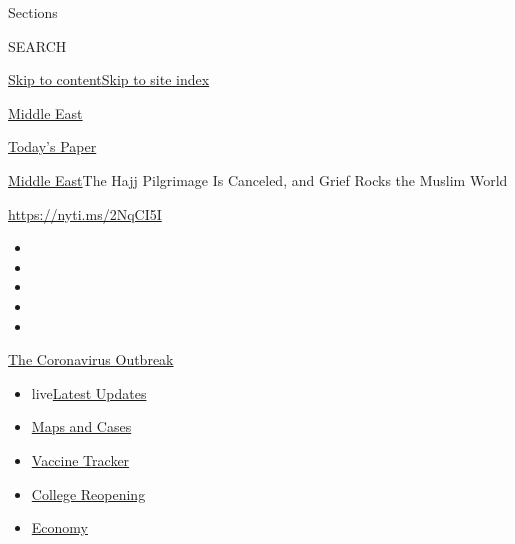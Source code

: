 Sections

SEARCH

\protect\hyperlink{site-content}{Skip to
content}\protect\hyperlink{site-index}{Skip to site index}

\href{https://www.nytimes3xbfgragh.onion/section/world/middleeast}{Middle
East}

\href{https://myaccount.nytimes3xbfgragh.onion/auth/login?response_type=cookie\&client_id=vi}{}

\href{https://www.nytimes3xbfgragh.onion/section/todayspaper}{Today's
Paper}

\href{/section/world/middleeast}{Middle East}\textbar{}The Hajj
Pilgrimage Is Canceled, and Grief Rocks the Muslim World

\url{https://nyti.ms/2NqCI5I}

\begin{itemize}
\item
\item
\item
\item
\item
\end{itemize}

\href{https://www.nytimes3xbfgragh.onion/news-event/coronavirus?action=click\&pgtype=Article\&state=default\&region=TOP_BANNER\&context=storylines_menu}{The
Coronavirus Outbreak}

\begin{itemize}
\tightlist
\item
  live\href{https://www.nytimes3xbfgragh.onion/2020/08/04/world/coronavirus-cases.html?action=click\&pgtype=Article\&state=default\&region=TOP_BANNER\&context=storylines_menu}{Latest
  Updates}
\item
  \href{https://www.nytimes3xbfgragh.onion/interactive/2020/us/coronavirus-us-cases.html?action=click\&pgtype=Article\&state=default\&region=TOP_BANNER\&context=storylines_menu}{Maps
  and Cases}
\item
  \href{https://www.nytimes3xbfgragh.onion/interactive/2020/science/coronavirus-vaccine-tracker.html?action=click\&pgtype=Article\&state=default\&region=TOP_BANNER\&context=storylines_menu}{Vaccine
  Tracker}
\item
  \href{https://www.nytimes3xbfgragh.onion/2020/08/02/us/covid-college-reopening.html?action=click\&pgtype=Article\&state=default\&region=TOP_BANNER\&context=storylines_menu}{College
  Reopening}
\item
  \href{https://www.nytimes3xbfgragh.onion/live/2020/08/04/business/stock-market-today-coronavirus?action=click\&pgtype=Article\&state=default\&region=TOP_BANNER\&context=storylines_menu}{Economy}
\end{itemize}


